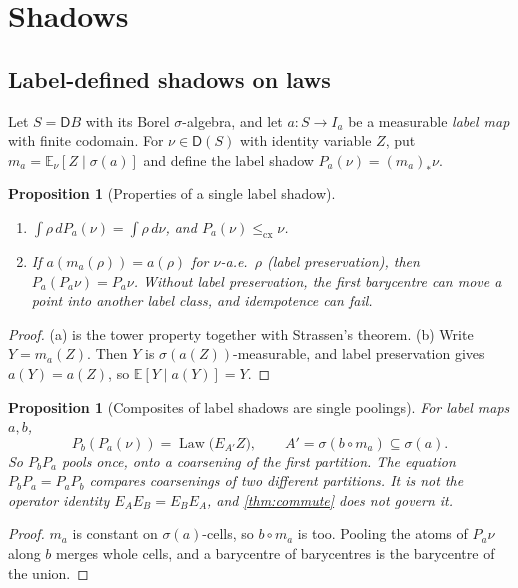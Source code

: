 \documentclass[11pt]{article}
\newtheorem{proposition}[theorem]{Proposition}
\theoremstyle{definition}
\newcommand{\D}{\mathsf D}
\newcommand{\cx}{\le_{\mathrm{cx}}}
\newcommand{\Law}{\operatorname{Law}}
\newcommand{\EE}{\mathbb E}
\begin{document}
\section{Shadows}\label{sec:shadows}

\subsection{Label-defined shadows on laws}
Let $S=\D B$ with its Borel $\sigma$-algebra, and let $a\colon S\to I_a$ be a measurable \emph{label map} with finite codomain. For
$\nu\in\D(S)$ with identity variable $Z$, put $m_a=\EE_\nu[Z\mid\sigma(a)]$ and define the label shadow $P_a(\nu)=(m_a)_*\nu$.

\begin{proposition}[Properties of a single label shadow]\label{prop:label-props}
\begin{enumerate}[label=(\alph*)]
\item $\int\rho\,dP_a(\nu)=\int\rho\,d\nu$, and $P_a(\nu)\cx\nu$.
\item If $a(m_a(\rho))=a(\rho)$ for $\nu$-a.e.\ $\rho$ (\emph{label preservation}), then $P_a(P_a\nu)=P_a\nu$. Without label
  preservation, the first barycentre can move a point into another label class, and idempotence can fail.
\end{enumerate}
\end{proposition}
\begin{proof}
(a) is the tower property together with Strassen's theorem. (b) Write $Y=m_a(Z)$. Then $Y$ is $\sigma(a(Z))$-measurable, and label
preservation gives $a(Y)=a(Z)$, so $\EE[Y\mid a(Y)]=Y$.
\end{proof}

\begin{proposition}[Composites of label shadows are single poolings]\label{prop:naive}
For label maps $a,b$,
\[
P_b(P_a(\nu))=\Law\big(E_{A'}Z\big),\qquad A'=\sigma(b\circ m_a)\subseteq\sigma(a).
\]
So $P_bP_a$ pools once, onto a coarsening of the \emph{first} partition. The equation $P_bP_a=P_aP_b$ compares coarsenings of two
different partitions. It is not the operator identity $E_AE_B=E_BE_A$, and \cref{thm:commute} does not govern it.
\end{proposition}
\begin{proof}
$m_a$ is constant on $\sigma(a)$-cells, so $b\circ m_a$ is too. Pooling the atoms of $P_a\nu$ along $b$ merges whole cells, and a
barycentre of barycentres is the barycentre of the union.
\end{proof}
\end{document}
